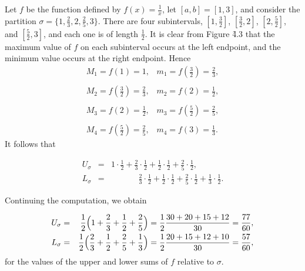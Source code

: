 \begin{example}
Let $f$ be the function defined by $f(x) = \frac{1}{x}$, let $[a, b] = [1, 3]$, and consider the partition $\sigma = \{ 1, \frac{2}{3}, 2, \frac{2}{5}, 3 \}$.  There are four subintervals, $[1, \frac{3}{2}]$, $[\frac{3}{2}, 2]$, $[2, \frac{5}{2}]$, and $[\frac{5}{2}, 3]$, and each one is of length $\frac{1}{2}$. It is clear from
Figure \f{4.3} that the maximum value of $f$ on each subinterval occurs at the left endpoint, and the minimum value occurs at the right endpoint. Hence
$$
\begin{array}{l}
M_1 = f(1) = 1,                      \;\;\; m_1 = f(\frac{3}{2}) = \frac{2}{3}, \\
\\
M_2 = f(\frac{3}{2}) = \frac{2}{3},         \;\;\; m_2 = f(2) = \frac{1}{2}, \\
\\
M_3 = f(2) = \frac{1}{2},          \;\;\; m_3 = f(\frac{5}{2}) = \frac{2}{5}, \\
\\
M_4 = f(\frac{5}{2}) = \frac{2}{5}, \;\;\; m_4 = f(3) = \frac{1}{3}.
\end{array}
$$
\noindent It follows that 

\begin{eqnarray*}
U_{\sigma} &=& 1 \cdot \frac{1}{2} + \frac{2}{3} \cdot \frac{1}{2} + \frac{1}{2} \cdot \frac{1}{2} + \frac{2}{5} \cdot
\frac{1}{2}, \\
 L_{\sigma} &=& \;\;\;\;\;\;\;\;\;\;\;\; \frac{2}{3} \cdot \frac{1}{2} + \frac{1}{2} \cdot \frac{1}{2} + \frac{2}{5} \cdot
\frac{1}{2} +
\frac{1}{3} \cdot \frac{1}{2}.
\end{eqnarray*}
  

\noindent Continuing the computation, we obtain

\begin{eqnarray*}
U_{\sigma} &=& \frac{1}{2} \Bigl(1 + \frac{2}{3} + \frac{1}{2} + \frac{2}{5} \Bigr) = \frac{1}{2} \frac{ 30 + 20 + 15 +
12}{30} =
\frac{77}{60},  \\ 
L_{\sigma} &=& \frac{1}{2} \Bigl( \frac{2}{3} + \frac{1}{2} + \frac{2}{5} + \frac{1}{3} \Bigr) = \frac{1}{2}
\frac{ 20 + 15 + 12 + 10}{30} = \frac{57}{60}, 
\end{eqnarray*}
\noindent for the values of the upper and lower sums of $f$ relative to $\sigma$.
\end{example}
\medskip


